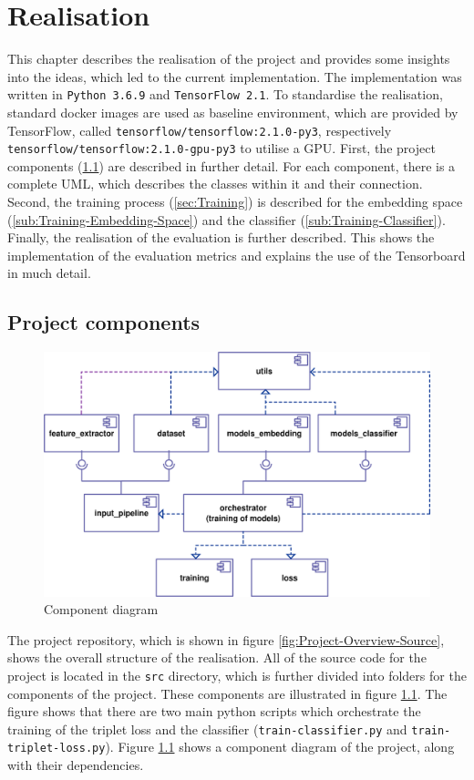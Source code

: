 \chapter{Realisation}
\label{ch:Realisation}
This chapter describes the realisation of the project and provides some insights into the ideas, which led to the current implementation. The implementation was written in \texttt{Python 3.6.9} and \texttt{TensorFlow 2.1}. To standardise the realisation, standard docker images are used as baseline environment, which are provided by TensorFlow, called \texttt{tensorflow/tensorflow:2.1.0-py3}, respectively \texttt{tensorflow/tensorflow:2.1.0-gpu-py3} to utilise a \gls{GPU}.
\newline
\newline
First, the project components (\ref{sec:Project-Components}) are described in further detail. For each component, there is a complete UML, which describes the classes within it and their connection. Second, the training process (\ref{sec:Training}) is described for the embedding space (\ref{sub:Training-Embedding-Space}) and the classifier (\ref{sub:Training-Classifier}). Finally, the realisation of the evaluation is further described. This shows the implementation of the evaluation metrics and explains the use of the Tensorboard in much detail.

\section{Project components}
\label{sec:Project-Components}
\begin{figure}[htb]
	\centering
	\includegraphics[width=0.6\linewidth]{img/Component_Diagram.png}
	\caption{Component diagram}
	\label{fig:Component-Diagram}
\end{figure}
\noindent
The project repository, which is shown in figure \ref{fig:Project-Overview-Source}, shows the overall structure of the realisation. All of the source code for the project is located in the \texttt{src} directory, which is further divided into folders for the components of the project. These components are illustrated in figure \ref{sec:Project-Components}. The figure shows that there are two main python scripts which orchestrate the training of the triplet loss and the classifier (\texttt{train-classifier.py} and \texttt{train-triplet-loss.py}). Figure \ref{fig:Component-Diagram} shows a component diagram of the project, along with their dependencies.

